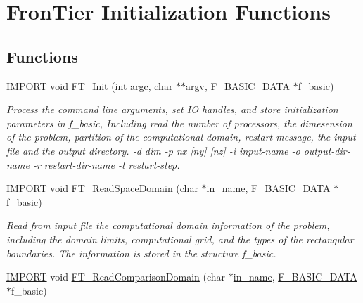 \hypertarget{group___i_n_i_t_i_a_l_i_z_a_t_i_o_n}{}\section{Fron\+Tier Initialization Functions}
\label{group___i_n_i_t_i_a_l_i_z_a_t_i_o_n}
\subsection*{Functions}
\begin{DoxyCompactItemize}
\item 
\hyperlink{cdecs_8h_a773175d74e73776d69c3e538f17de1ee}{I\+M\+P\+O\+RT} void \hyperlink{group___i_n_i_t_i_a_l_i_z_a_t_i_o_n_gaabc3a4a619100a7f79ccab041e56f13c}{F\+T\+\_\+\+Init} (int argc, char $\ast$$\ast$argv, \hyperlink{fdecs_8h_aa0691918b7151755ba8c2abfbde73314}{F\+\_\+\+B\+A\+S\+I\+C\+\_\+\+D\+A\+TA} $\ast$f\+\_\+basic)
\begin{DoxyCompactList}\small\item\em Process the command line arguments, set IO handles, and store initialization parameters in f\+\_\+basic, Including read the number of processors, the dimesension of the problem, partition of the computational domain, restart message, the input file and the output directory. -\/d dim -\/p nx \mbox{[}ny\mbox{]} \mbox{[}nz\mbox{]} -\/i input-\/name -\/o output-\/dir-\/name -\/r restart-\/dir-\/name -\/t restart-\/step. \end{DoxyCompactList}\item 
\hyperlink{cdecs_8h_a773175d74e73776d69c3e538f17de1ee}{I\+M\+P\+O\+RT} void \hyperlink{group___i_n_i_t_i_a_l_i_z_a_t_i_o_n_ga9f0c9eacbefffd97c78270a99028fcc4}{F\+T\+\_\+\+Read\+Space\+Domain} (char $\ast$\hyperlink{testfront_8c_aade3fd761de40ee7c68bcad6339774cc}{in\+\_\+name}, \hyperlink{fdecs_8h_aa0691918b7151755ba8c2abfbde73314}{F\+\_\+\+B\+A\+S\+I\+C\+\_\+\+D\+A\+TA} $\ast$f\+\_\+basic)
\begin{DoxyCompactList}\small\item\em Read from input file the computational domain information of the problem, including the domain limits, computational grid, and the types of the rectangular boundaries. The information is stored in the structure f\+\_\+basic. \end{DoxyCompactList}\item 
\hyperlink{cdecs_8h_a773175d74e73776d69c3e538f17de1ee}{I\+M\+P\+O\+RT} void \hyperlink{group___i_n_i_t_i_a_l_i_z_a_t_i_o_n_ga5691571dfcb374f3bfd1bab6e2185ae5}{F\+T\+\_\+\+Read\+Comparison\+Domain} (char $\ast$\hyperlink{testfront_8c_aade3fd761de40ee7c68bcad6339774cc}{in\+\_\+name}, \hyperlink{fdecs_8h_aa0691918b7151755ba8c2abfbde73314}{F\+\_\+\+B\+A\+S\+I\+C\+\_\+\+D\+A\+TA} $\ast$f\+\_\+basic)
$$
\end{DoxyCompactItemize}
